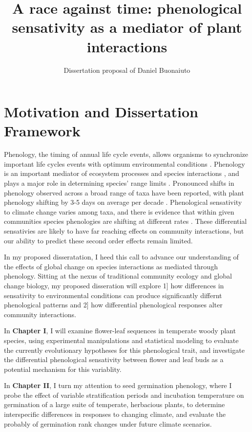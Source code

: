 \documentclass{article}\usepackage[]{graphicx}\usepackage[]{color}
\begin{document}
\title{A race against time: phenological sensativity as a mediator of plant interactions}
\author{Dissertation proposal of Daniel Buonaiuto}
\maketitle{}
\section*{Motivation and Dissertation Framework}
\indent\indent Phenology, the timing of annual life cycle events, allows organisms to synchronize important life cycles events with optimum environmental conditions \citep{Forrest2010}. Phenology is an important mediator of ecosystem processes \citep{Piao2007,Cleland2007} and species interactions \citep{Yang2010,Leverett2017}, and plays a major role in determining species' range limits \citep{Chuine2001}. Pronounced shifts in phenology observed across a broad range of taxa have been reported, with plant phenology shifting by 3-5 days on average per decade \citep{Parmesan2003,Menzel2006,Root2003}. Phenological sensativity to climate change varies among taxa, and there is evidence that within given communities species phenologies are shifting at different rates \citep{Cleland2012,Ovaskainen2013}. These differential sensativies are likely to have far reaching effects on community interactions, but our ability to predict these second order effects remain limited.
\par In my proposed disseratation, I heed this call to advance our understanding of the effects of global change on species interactions as mediated through phenology. Sitting at the nexus of traditional community ecology and global change biology, my proposed disseration will explore 1] how differences in sensativity to environmental conditions can produce significantly differnt phenological patterns and 2] how differential phenological responses alter community interactions.
\par In \textbf{Chapter I}, I will examine flower-leaf sequences in temperate woody plant species, using experimental manipulations and statistical modeling to evaluate the currently evolutionary hypotheses for this phenological trait, and investigate the differential phenological sensativity between flower and leaf buds as a potential mechanism for this variablity.
\par In \textbf{Chapter II}, I turn my attention to seed germination phenology, where I probe the effect of variable stratification periods and incubation temperature on germination of a large suite of temperate, herbacious plants, to determine interspecific differences in responses to changing climate, and evaluate the probably of germination rank changes under future climate scenarios.
\end{document}
